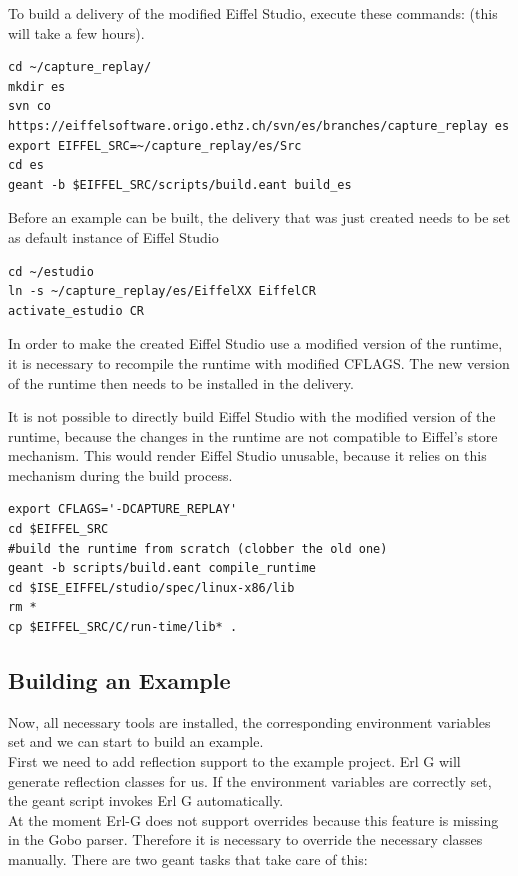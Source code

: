 To build a delivery of the modified Eiffel Studio, execute these commands: (this will take a few hours).
\begin{lstlisting}
cd ~/capture_replay/
mkdir es
svn co https://eiffelsoftware.origo.ethz.ch/svn/es/branches/capture_replay es
export EIFFEL_SRC=~/capture_replay/es/Src
cd es
geant -b $EIFFEL_SRC/scripts/build.eant build_es
\end{lstlisting}

Before an example can be built, the delivery that was just created needs to be set as default instance of Eiffel Studio
\begin{lstlisting}
cd ~/estudio
ln -s ~/capture_replay/es/EiffelXX EiffelCR
activate_estudio CR
\end{lstlisting}

In order to make the created Eiffel Studio use a modified version of the runtime, it is necessary to recompile the runtime with modified CFLAGS. The new version of the runtime then needs to be installed in the delivery.

It is not possible to directly build Eiffel Studio with the modified version of the runtime, because the changes in the runtime are not compatible to Eiffel's store mechanism. This would render Eiffel Studio unusable, because it relies on this mechanism during the build process.
\begin{lstlisting}
export CFLAGS='-DCAPTURE_REPLAY' 
cd $EIFFEL_SRC
#build the runtime from scratch (clobber the old one)
geant -b scripts/build.eant compile_runtime
cd $ISE_EIFFEL/studio/spec/linux-x86/lib
rm *
cp $EIFFEL_SRC/C/run-time/lib* .
\end{lstlisting}


\subsection{Building an Example}
Now, all necessary tools are installed, the corresponding environment variables set and we can start to build an example.\\
First we need to add reflection support to the example project. Erl G will generate reflection classes for us. If the environment variables are correctly set, the geant script invokes Erl G automatically. \\
At the moment Erl-G does not support overrides because this feature is missing in the Gobo parser. Therefore it is necessary to override the necessary classes manually. There are two geant tasks that take care of this:

